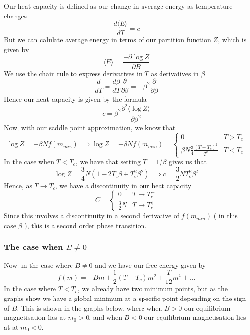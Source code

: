 \documentclass[11pt, oneside]{article}   	%
\begin{document}
Our heat capacity is defined as our change in average energy as temperature changes
\[ 
\frac{ d \langle E \rangle }{ dT}  = c
\] 
But we can calulate average energy in terms of our partition function $Z$, which is given by 
\[ 
\langle E \rangle = \frac{ - \partial \log Z }{ \partial B} 
\] 
We use the chain rule to express derivatives in $T$ as derivatives in $\beta$
\[ 
\frac{d}{ dT} = \frac{ d \beta} { dT } \frac{ \partial }{ \partial \beta} =  - \beta^ 2 \frac{ \partial }{ \partial \beta} 
\] 
Hence our heat capacity is given by the formula 
\[ 
c = \beta^2 \frac{ \partial^2 \langle \log Z \rangle}{ \partial \beta^2 } \] 
Now, with our saddle point approximation, we know that 
\[ 
\log Z = - \beta N f(m_{min} ) \implies \log Z =  - \beta N f(m_{min}) = \begin{cases} 
0 & T > T_c \\
\beta N \frac{ 3}{ 4} \frac{ ( T - T_c)^2 }{ T^2 }  & T < T_c 
\end{cases} 
\]  
In the case when $ T < T_c $, we have that setting $T = 1 / \beta $ gives us that 
\[ 
\log Z = \frac{ 3}{ 4} N ( 1 - 2 T_c \beta + T_c^2 \beta^2 ) \implies c = \frac{3}{ 2} N T_c^2 \beta^2 
\] 
Hence, as $T \rightarrow T_c$, we have a discontinuity in our heat capacity \[ 
C = \begin{cases} 
0 & T \rightarrow T_c^- \\
\frac{3}{2} N & T \rightarrow T_c^+ 
\end{cases} 
\] 
Since this involves a discontinuity in a second derivative of $f(m_{min})$ ( in this case $\beta$ ), this is a second order phase transition. 


\subsubsection*{The case when $B \neq 0 $} 
Now, in the case where $B \neq 0$ and we have our free energy given by 
\[ 
f(m) =  - Bm + \frac{1}{ 2}( T - T_c )m^2 + \frac{T}{ 12} m^4 + \dots \] 
In the case where $T < T_c$, we already have two minimum points, but as the graphs show we have a global minimum at a specific point depending on the sign of $B$. This is shown in the graphs below, where when $B>0$ our equilibrium magnetisation lies at $m_0 > 0$, and when $ B < 0 $ our equilibrium magnetisation lies at at $m_0 < 0$. 
\end{document}
